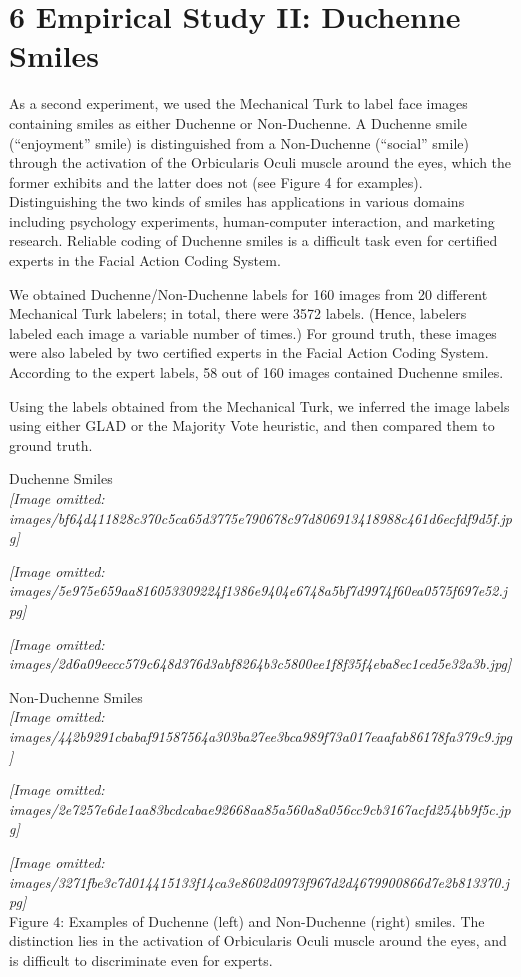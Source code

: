 \documentclass[
]{article}
\begin{document}
\section{6 Empirical Study II: Duchenne
Smiles}\label{empirical-study-ii-duchenne-smiles}

As a second experiment, we used the Mechanical Turk to label face images
containing smiles as either Duchenne or Non-Duchenne. A Duchenne smile
(``enjoyment'' smile) is distinguished from a Non-Duchenne (``social''
smile) through the activation of the Orbicularis Oculi muscle around the
eyes, which the former exhibits and the latter does not (see Figure 4
for examples). Distinguishing the two kinds of smiles has applications
in various domains including psychology experiments, human-computer
interaction, and marketing research. Reliable coding of Duchenne smiles
is a difficult task even for certified experts in the Facial Action
Coding System.

We obtained Duchenne/Non-Duchenne labels for 160 images from 20
different Mechanical Turk labelers; in total, there were 3572 labels.
(Hence, labelers labeled each image a variable number of times.) For
ground truth, these images were also labeled by two certified experts in
the Facial Action Coding System. According to the expert labels, 58 out
of 160 images contained Duchenne smiles.

Using the labels obtained from the Mechanical Turk, we inferred the
image labels using either GLAD or the Majority Vote heuristic, and then
compared them to ground truth.

Duchenne Smiles\\
\textit{[Image omitted: images/bf64d411828c370c5ca65d3775e790678c97d806913418988c461d6ecfdf9d5f.jpg]}

\textit{[Image omitted: images/5e975e659aa816053309224f1386e9404e6748a5bf7d9974f60ea0575f697e52.jpg]}

\textit{[Image omitted: images/2d6a09eecc579c648d376d3abf8264b3c5800ee1f8f35f4eba8ec1ced5e32a3b.jpg]}

Non-Duchenne Smiles\\
\textit{[Image omitted: images/442b9291cbabaf91587564a303ba27ee3bca989f73a017eaafab86178fa379c9.jpg]}

\textit{[Image omitted: images/2e7257e6de1aa83bcdcabae92668aa85a560a8a056cc9cb3167acfd254bb9f5c.jpg]}

\textit{[Image omitted: images/3271fbe3c7d014415133f14ca3e8602d0973f967d2d4679900866d7e2b813370.jpg]}\\
Figure 4: Examples of Duchenne (left) and Non-Duchenne (right) smiles.
The distinction lies in the activation of Orbicularis Oculi muscle
around the eyes, and is difficult to discriminate even for experts.
\end{document}
